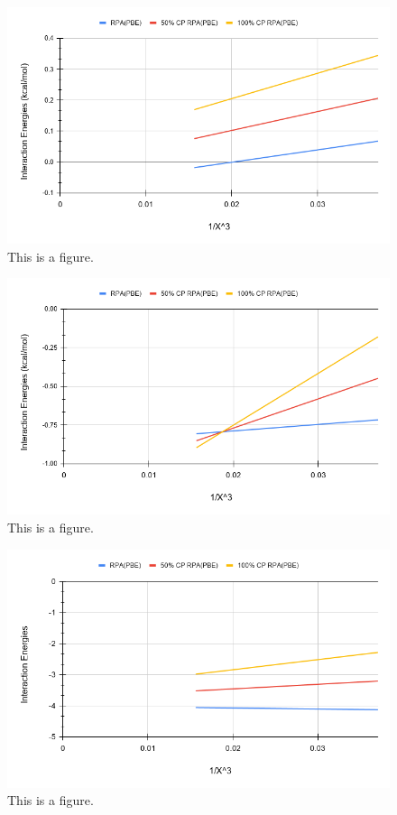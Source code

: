 \documentclass[11pt]{article}
\begin{document}
\begin{figure}
  \includegraphics[scale=0.5]{tpss_1.png}
  \caption{This is a figure.}
  \label{fig:<name>}
\end{figure}

\begin{figure}
  \includegraphics[scale=0.5]{tpss_8.png}
  \caption{This is a figure.}
  \label{fig:<name>}
\end{figure}

\begin{figure}
  \includegraphics[scale=0.5]{tpss_11.png}
  \caption{This is a figure.}
  \label{fig:<name>}
\end{figure}
\end{document}
